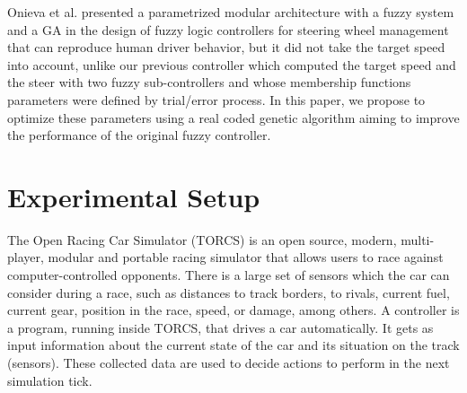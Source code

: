 \documentclass[sigconf]{acmart}
\begin{document}
Onieva et al. \cite{LFAG} presented a parametrized modular architecture with a fuzzy system and a GA in the design of fuzzy logic controllers for steering wheel management that can reproduce human driver behavior, but it did not take the target speed into account, unlike our previous controller \cite{evo17} which computed the target speed and the steer with two fuzzy sub-controllers and whose membership functions parameters were defined by trial/error process.
In this paper, we propose to optimize these parameters using a real coded genetic algorithm aiming to improve the performance of the original fuzzy controller. %


\section{Experimental Setup}
\label{sec:torcs}

The Open Racing Car Simulator (TORCS) \cite{WebTORCS} is an open source, modern, multi-player, modular and portable racing simulator that allows users to race against computer-controlled opponents.
There is a large set of sensors \cite{Torcs3} which the car can consider during a race, such as distances to track borders, to rivals, current fuel, current gear, position in the race, speed, or damage, among others.
A controller is a program, running inside TORCS, that 
drives a car automatically. It gets as input information about the current state of
the car and its situation on the track (sensors). These collected data
are used to decide actions to perform in the next simulation tick.  
\end{document}
